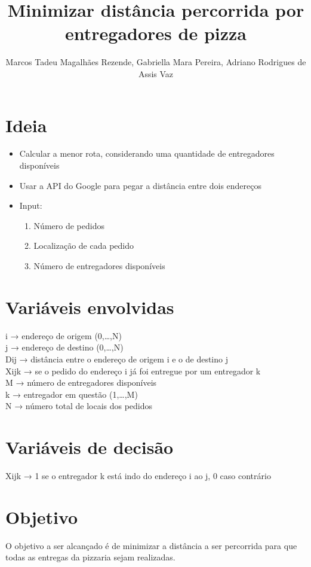 \documentclass[12pt]{article}
\title{Minimizar distância percorrida por entregadores de pizza}
\author{Marcos Tadeu Magalhães Rezende\inst{1}, Gabriella Mara Pereira\inst{1}, Adriano Rodrigues de Assis Vaz\inst{1}}
\begin{document}
 

\maketitle

\section{Ideia}

\begin{itemize}
    \item Calcular a menor rota, considerando uma quantidade de entregadores disponíveis
    \item Usar a API do Google para pegar a distância entre dois endereços
    \item Input:
    \begin{enumerate}
        \item Número de pedidos
        \item Localização de cada pedido 
        \item Número de entregadores disponíveis
    \end{enumerate}
\end{itemize}

\section{Variáveis envolvidas}
i → endereço de origem (0,…,N)
\\j → endereço de destino (0,…,N)
\\Dij → distância entre o endereço de origem i e o de destino j
\\Xijk → se o pedido do endereço i já foi entregue por um entregador k
\\M → número de entregadores disponíveis
\\k → entregador em questão (1,…,M)
\\N → número total de locais dos pedidos 

\section{Variáveis de decisão}
Xijk → 1 se o entregador k está indo do endereço i ao j, 0 caso contrário

\section{Objetivo}
O objetivo a ser alcançado é de minimizar a distância a ser percorrida para que todas as entregas da pizzaria sejam realizadas.
\end{document}
